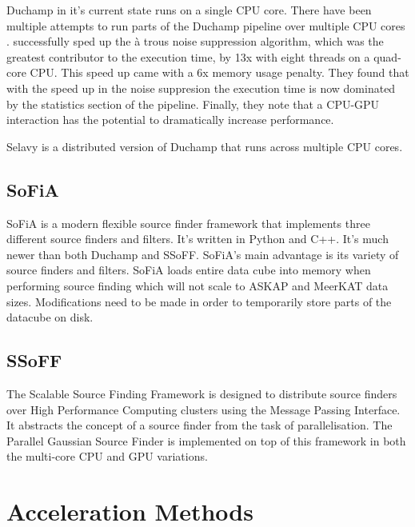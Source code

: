 \documentclass[prodmode,acmtecs]{acmsmall} \usepackage[ruled]{algorithm2e}
\begin{document}
Duchamp in it's current state runs on a single CPU core. There have been multiple attempts to run
parts of the Duchamp pipeline over multiple CPU cores \cite{scott} \cite{whiting2012source}. \cite{scott} 
 successfully sped
up the \`{a} trous noise suppression algorithm, which was the greatest contributor to the 
execution time, by 13x with eight threads on a quad-core CPU.
This speed up came with a 6x memory usage penalty. They found that with the speed up in the noise
suppresion the execution time is now dominated by the statistics section of the pipeline. Finally,
they note that a CPU-GPU interaction has the potential to dramatically increase performance.

Selavy \cite{whiting2012source} is a distributed version of Duchamp that runs across multiple CPU
\cite{} cores.


    \subsection{SoFiA}
    SoFiA is a modern flexible source finder framework that implements three different source finders
    and filters. It's written in Python and C++. It's much newer than both Duchamp and SSoFF. 
    SoFiA's main advantage is its variety of source finders and filters.  
    SoFiA loads entire data cube into memory when performing source finding which will not scale to ASKAP
    and MeerKAT data sizes. Modifications need to be made in order to temporarily store parts of the datacube
    on disk.
        \cite{serra2015sofia}
        
     

        \subsection{SSoFF}
The Scalable Source Finding Framework  is designed to distribute source finders over High Performance
Computing clusters using the Message Passing Interface. It abstracts the concept of a source finder from
the task of parallelisation. The Parallel Gaussian Source Finder is implemented on top
of this framework in both the multi-core CPU and GPU variations.



\section{Acceleration Methods}
\end{document}
